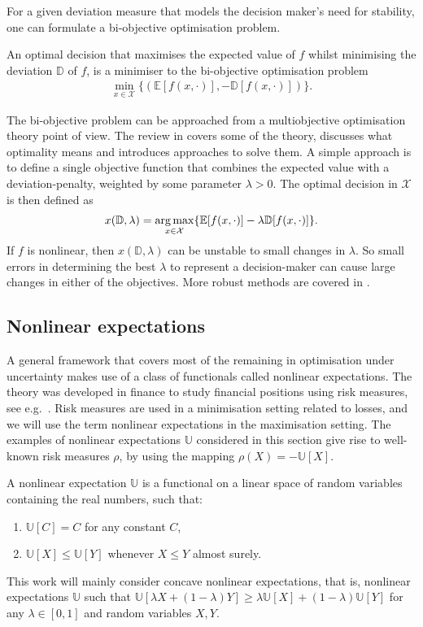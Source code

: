 \documentclass[main.tex]{subfiles}
\begin{document}
For a given deviation measure that models the decision maker's
need for stability, one can formulate a bi-objective optimisation
problem.
\begin{problem}
  An optimal decision that maximises the expected value of $f$ whilst
  minimising the deviation $\mathbb D$ of $f$, is a minimiser to the
  bi-objective optimisation problem
  \begin{align}
    \min_{x\in\mathcal{X}}\{(\mathbb E[f(x,\cdot)],-\mathbb D[f(x,\cdot)])\}.
  \end{align}
\end{problem}
The bi-objective problem can be approached from a multiobjective
optimisation theory point of view.
The review in \citep{marler2004survey} covers some of the theory,
discusses what optimality means and introduces approaches to solve them.
A simple approach is to define a single objective function that combines
the expected value with a deviation-penalty, weighted by some
parameter $\lambda>0$. The optimal decision in $\mathcal{X}$ is then
defined as
\begin{align}
  x(\mathbb D,\lambda)=\operatorname*{arg\,max}_{x\in\mathcal{X}}\{\mathbb
  E[f(x,\cdot)]-\lambda \mathbb D[f(x,\cdot)]\}.
\end{align}
If $f$ is nonlinear, then $x(\mathbb D,\lambda)$ can be unstable to
small changes in $\lambda$. So small errors in determining the best
$\lambda$ to represent a decision-maker can cause large changes in
either of the objectives. More robust methods are covered in
\citep{marler2004survey}.

\subsection{Nonlinear expectations}\label{sec:nonlinear_expectations}
A general framework that covers most of the remaining
in optimisation under uncertainty makes use of a class of functionals
called nonlinear expectations.
The theory was developed in finance to study financial positions using
risk measures, see
e.g.~\citep[Ch.~4]{follmer2004stochastic}.
Risk measures are used in a minimisation setting related to losses,
and we will use the term nonlinear expectations in the maximisation
setting. The examples of nonlinear expectations $\mathbb U$ considered
in this section give rise to well-known risk measures $\rho$, by using the mapping
$\rho(X) = -\mathbb U[X]$.

\begin{mydef}
  A nonlinear expectation $\mathbb U$ is a functional on a linear space of random
  variables containing the real numbers, such that:
  \begin{enumerate}
  \item $\mathbb U[C] = C$ for any constant $C$,
  \item $\mathbb U[X]\leq \mathbb U[Y]$ whenever $X\leq Y$ almost surely.
  \end{enumerate}
  This work will mainly consider concave nonlinear expectations, that
  is, nonlinear expectations $\mathbb{U}$ such that
  $\mathbb{U}[\lambda X + (1-\lambda)Y]\geq \lambda\mathbb{U}[X] +
  (1-\lambda) \mathbb{U}[Y]$ for any $\lambda\in[0,1]$ and random
  variables $X,Y$.
\end{mydef}
\end{document}
